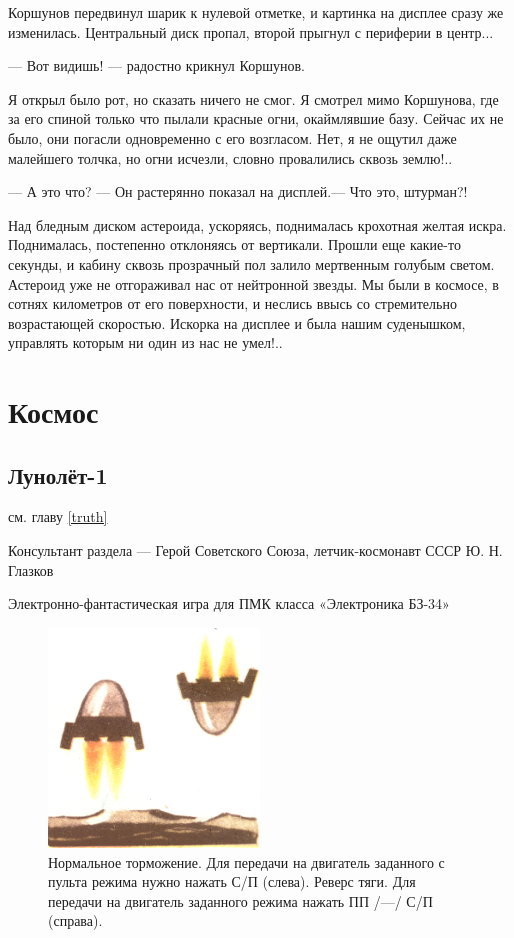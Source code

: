 \documentclass[11pt,a4paper,oneside]{article}
\begin{document}
Коршунов передвинул шарик к нулевой отметке, и картинка на дисплее сразу же изменилась. Центральный диск пропал, второй прыгнул с периферии в центр...

— Вот видишь! — радостно крикнул Коршунов.

Я открыл было рот, но сказать ничего не смог. Я смотрел мимо Коршунова, где за его спиной только что пылали красные огни, окаймлявшие базу. Сейчас их не было, они погасли одновременно с его возгласом. Нет, я не ощутил даже малейшего толчка, но огни исчезли, словно провалились сквозь землю!..

— А это что? — Он растерянно показал на дисплей.— Что это, штурман?!

Над бледным диском астероида, ускоряясь, поднималась крохотная желтая искра. Поднималась, постепенно отклоняясь от вертикали.
Прошли еще какие-то секунды, и кабину сквозь прозрачный пол залило мертвенным голубым светом. Астероид уже не отгораживал нас от нейтронной звезды. Мы были в космосе, в сотнях километров от его поверхности, и неслись ввысь со стремительно возрастающей скоростью. Искорка на дисплее и была нашим суденышком, управлять которым ни один из нас не умел!..

\section{Космос}
\subsection{Лунолёт-1}
см. главу \ref{truth}

Консультант раздела — Герой Советского Союза, летчик-космонавт СССР Ю. Н. Глазков

Электронно-фантастическая игра для ПМК класса «Электроника БЗ-34»

\begin{figure}[H]
\includegraphics[width=0.5\textwidth]{lunolet1_orientation}
\caption{Нормальное торможение. Для передачи на двигатель заданного с пульта режима нужно нажать С/П (слева). Реверс тяги. Для передачи на двигатель заданного режима нажать ПП /—/ С/П (справа).}
\end{figure}
\end{document}
